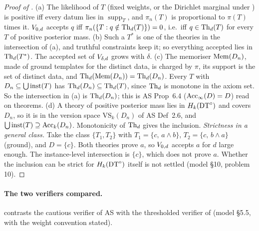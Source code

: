 \begin{proof}[Proof of ]
(a) The likelihood of $T$ (fixed weights, or the Dirichlet marginal under \Lzero) is positive iff every datum lies in $\operatorname{supp}_T$, and $\pi_n(T)$ is proportional to $\pi(T)$ times it. $V_{0,d}$ accepts $q$ iff $\pi_n(\{T:q\notin\mathrm{Th}_d(T)\})=0$, i.e.\ iff $q\in\mathrm{Th}_d(T)$ for every $T$ of positive posterior mass.
(b) Such a $T^*$ is one of the theories in the intersection of (a), and truthful constraints keep it; so everything accepted lies in $\mathrm{Th}_d(T^*)$. The accepted set of $V_{\delta,d}$ grows with $\delta$.
(c) The memoriser $\mathrm{Mem}(D_n)$, made of ground templates for the distinct data, is charged by $\pi$, its support is the set of distinct data, and $\mathrm{Th}_d(\mathrm{Mem}(D_n))=\mathrm{Th}_d(D_n)$. Every $T$ with $D_n\subseteq\bigcup\mathrm{inst}(T)$ has $\mathrm{Th}_d(D_n)\subseteq\mathrm{Th}_d(T)$, since $\mathrm{Th}_d$ is monotone in the axiom set. So the intersection in (a) is $\mathrm{Th}_d(D_n)$; this is AS Prop~6.4 ($\mathrm{Acc}_\infty(D)=D$) read on theorems.
(d) A theory of positive posterior mass lies in $H_{k}(\mathrm{DT}^{\circ})$ and covers $D_n$, so it is in the version space $\mathrm{VS}_k(D_n)$ of AS Def~2.6, and $\bigcup\mathrm{inst}(T)\supseteq\mathrm{Acc}_k(D_n)$. Monotonicity of $\mathrm{Th}_d$ gives the inclusion.
\emph{Strictness in a general class.} Take the class $\{T_1,T_2\}$ with $T_1=\{c,\,a\wedge b\}$, $T_2=\{c,\,b\wedge a\}$ (ground), and $D=\{c\}$. Both theories prove $a$, so $V_{0,d}$ accepts $a$ for $d$ large enough. The instance-level intersection is $\{c\}$, which does not prove $a$. Whether the inclusion can be strict for $H_{k}(\mathrm{DT}^{\circ})$ itself is not settled (model \S10, problem 10).
\end{proof}

\paragraph{The two verifiers compared.}  contrasts the cautious verifier of AS with the thresholded verifier of  (model \S5.5, with the weight convention stated).


